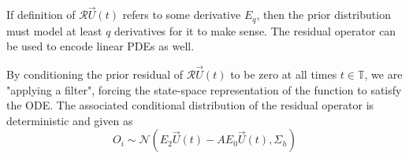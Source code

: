 If definition of $\mathcal{R}\vec{U}(t)$ refers to some derivative $E_q$, then the prior distribution must model at least $q$ derivatives for it to make sense. The residual operator can be used to encode linear PDEs as well.

By conditioning the prior residual of $\mathcal{R}\vec{U}(t)$ to be zero at all times $t \in \mathbb{T}$, we are "applying a filter", forcing the state-space representation of the function to satisfy the ODE. The associated conditional distribution of the residual operator is deterministic and given as $$O_i \sim \mathcal{N}(E_2\vec{U}(t) - AE_0\vec{U}(t), \Sigma_h)$$

